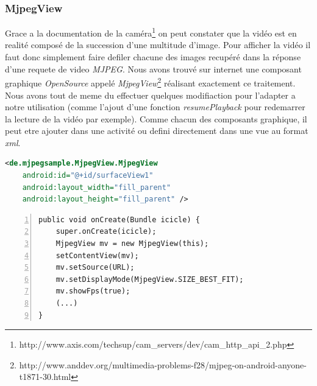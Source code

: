\subsubsection{MjpegView}
Grace a la documentation de la caméra\footnote{\label{docAxis}
http://www.axis.com/techsup/cam\_servers/dev/cam\_http\_api\_2.php} on peut
constater que la vidéo est en realité composé de la succession d'une multitude
d'image. Pour afficher la vidéo il faut donc simplement faire defiler chacune
des images recupéré dans la réponse d'une requete de video \textit{MJPEG}.
\newline
Nous avons trouvé sur internet une composant graphique \textit{OpenSource}
appelé \textit{MjpegView}\footnote{\label{MjpegView}
http://www.anddev.org/multimedia-problems-f28/mjpeg-on-android-anyone-t1871-30.html}
réalisant exactement ce traitement.
Nous avons tout de meme du effectuer quelques modifiaction pour l'adapter a
notre utilisation (comme l'ajout d'une fonction \textit{resumePlayback} pour
redemarrer la lecture de la vidéo par exemple).\newline
Comme chacun des composants graphique, il peut etre ajouter dans une activité ou
defini directement dans une vue au format \textit{xml}.\newline
\begin{center}
\begin{lstlisting}[language=XML, caption={video.xml}]
<de.mjpegsample.MjpegView.MjpegView
	android:id="@+id/surfaceView1"
	android:layout_width="fill_parent"
	android:layout_height="fill_parent" />
\end{lstlisting}
\end{center}
\begin{center}
\begin{lstlisting}[caption={mjpegViewer.java},  framexleftmargin=7mm,
numbers=left] 
public void onCreate(Bundle icicle) {
	super.onCreate(icicle);
	MjpegView mv = new MjpegView(this);
	setContentView(mv);
	mv.setSource(URL);
	mv.setDisplayMode(MjpegView.SIZE_BEST_FIT);
	mv.showFps(true);
	(...)
}
\end{lstlisting}
\end{center}


